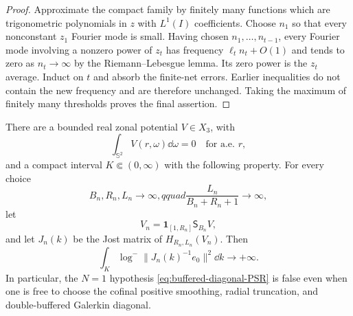 \begin{proof}
Approximate the compact family by finitely many functions which are
trigonometric polynomials in $z$ with $L^1(I)$ coefficients.  Choose $n_1$
so that every nonconstant $z_1$ Fourier mode is small.  Having chosen
$n_1,\ldots,n_{t-1}$, every Fourier mode involving a nonzero power of $z_t$
has frequency $\ell_t n_t+O(1)$ and tends to zero as $n_t\to\infty$ by the
Riemann--Lebesgue lemma.  Its zero power is the $z_t$ average.  Induct on $t$
and absorb the finite-net errors.  Earlier inequalities do not contain the
new frequency and are therefore unchanged.  Taking the maximum of finitely
many thresholds proves the final assertion.
\end{proof}

\begin{theorem}
\label{thm:fixed-potential-riesz-counterexample}
There are a bounded real zonal potential
$V\in X_3$, with
\begin{equation}
 \int_{\mathbb S^2}V(r,\omega)\dd\omega=0
 \quad\text{for a.e. }r,
 \label{eq:fixed-counterexample-zero-mean}
\end{equation}
and a compact interval $K\Subset(0,\infty)$ with the following property.
For every choice
\begin{equation}
 B_n,R_n,L_n\longrightarrow\infty,qquad
 \frac{L_n}{B_n+R_n+1}\longrightarrow\infty,
 \label{eq:arbitrary-buffered-diagonal}
\end{equation}
let
\begin{equation}
 V_n=\mathbf1_{[1,R_n]}\mathsf S_{B_n}V,
 \label{eq:fixed-counterexample-approximants}
\end{equation}
and let $J_n(k)$ be the Jost matrix of
$H_{R_n,L_n}(V_n)$.  Then
\begin{equation}
 \int_K\log^-\|J_n(k)^{-1}e_0\|^2\dd k
 \longrightarrow+\infty.
 \label{eq:fixed-potential-selected-entropy-divergence}
\end{equation}
In particular, the $N=1$ hypothesis
\eqref{eq:buffered-diagonal-PSR} is false even when one is free to choose the
cofinal positive smoothing, radial truncation, and double-buffered Galerkin
diagonal.
\end{theorem}


